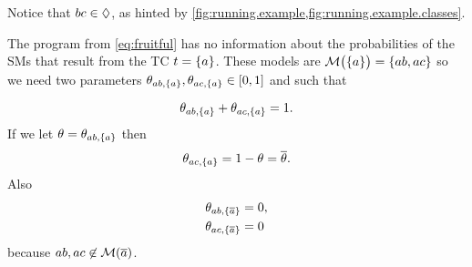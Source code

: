 \documentclass{article}
\begin{document}
Notice that \(bc \in \Diamond\), as hinted by
\cref{fig:running.example,fig:running.example.classes}.

The program from \cref{eq:fruitful} has no information about the
probabilities of the \aclp{SM} that result from the \acl{TC}
\(t = \set{a}\).  These models are
\(\MODELset\at{\set{a}} = \set{ab, ac}\) so we need two
parameters
\(\theta_{ab, \set{a}}, \theta_{ac, \set{a}} \in \intcc{0,1}\)
and such that

\begin{equation*}
	\theta_{ab, \set{a}} + \theta_{ac, \set{a}} = 1.
\end{equation*}
If we let \(\theta = \theta_{ab, \set{a}}\) then
\begin{equation*}
	\theta_{ac, \set{a}} = 1 - \theta = \overline{\theta}.
\end{equation*}
Also
\begin{equation*}
	\begin{split}
		\theta_{ab, \set{\ensuremath{\overline{a}}}} &= 0,\\
		\theta_{ac, \set{\ensuremath{\overline{a}}}} &= 0
	\end{split}
\end{equation*}
because \(ab, ac \not\in\MODELset\at{\co{a}}\).
\end{document}
